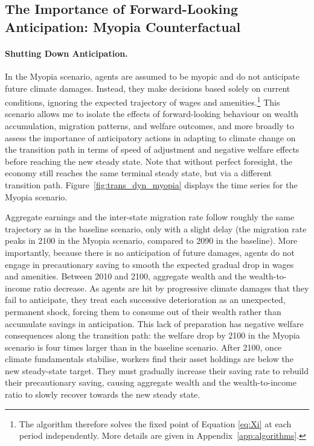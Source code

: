 \documentclass[12pt, a4paper]{article}
\begin{document}
\subsection{The Importance of Forward-Looking Anticipation: Myopia Counterfactual}
\paragraph{Shutting Down Anticipation.} In the Myopia scenario, agents are assumed to be myopic and do not anticipate future climate damages. Instead, they make decisions based solely on current conditions, ignoring the expected trajectory of wages and amenities.\footnote{The algorithm therefore solves the fixed point of Equation \ref{eq:Xi} at each period independently. More details are given in Appendix~\ref{app:algorithms}.} This scenario allows me to isolate the effects of forward-looking behaviour on wealth accumulation, migration patterns, and welfare outcomes, and more broadly to assess the importance of anticipatory actions in adapting to climate change on the transition path in terms of speed of adjustment and negative welfare effects before reaching the new steady state. Note that without perfect foresight, the economy still reaches the same terminal steady state, but via a different transition path. Figure~\ref{fig:trans_dyn_myopia} displays the time series for the Myopia scenario.



Aggregate earnings and the inter-state migration rate follow roughly the same trajectory as in the baseline scenario, only with a slight delay (the migration rate peaks in 2100 in the Myopia scenario, compared to 2090 in the baseline). More importantly, because there is no anticipation of future damages, agents do not engage in precautionary saving to smooth the expected gradual drop in wages and amenities. Between 2010 and 2100, aggregate wealth and the wealth-to-income ratio decrease. As agents are hit by progressive climate damages that they fail to anticipate, they treat each successive deterioration as an unexpected, permanent shock, forcing them to consume out of their wealth rather than accumulate savings in anticipation. This lack of preparation has negative welfare consequences along the transition path: the welfare drop by 2100 in the Myopia scenario is four times larger than in the baseline scenario. After 2100, once climate fundamentals stabilise, workers find their asset holdings are below the new steady-state target. They must gradually increase their saving rate to rebuild their precautionary saving, causing aggregate wealth and the wealth-to-income ratio to slowly recover towards the new steady state. 
\end{document}
